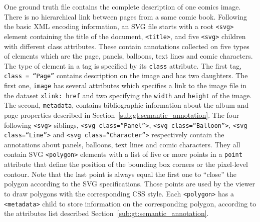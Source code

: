 One ground truth file contains the complete description of one comics image. 
There is no hierarchical link between pages from a same comic book. 
Following the basic XML encoding information, an SVG file starts with a root \texttt{<svg>} element containing the title of the document, \texttt{<title>}, and five \texttt{<svg>} children with different class attributes.
These contain annotations collected on five types of elements which are the page, panels, balloons, text lines and comic characters.
The type of element in a tag is specified by its \texttt{class} attribute.
The first tag, \texttt{class = ``Page''} contains description on the image and has two daughters.
The first one, \texttt{image} has several attributes which specifies a link to the image file in the dataset \texttt{xlink: href} and two specifying the \texttt{width} and \texttt{height} of the image.
The second, \texttt{metadata}, contains bibliographic information about the album and page properties described in Section~\ref{sub:gt:semantic_annotation}.
The four following \texttt{<svg>} siblings, \texttt{<svg class=``Panel''>}, \texttt{<svg class=``Balloon''>}, \texttt{<svg class=``Line''>} and \texttt{<svg class=``Character''>} respectively contain the annotations about panels, balloons, text lines and comic characters. 
They all contain SVG \texttt{<polygon>} elements with a list of five or more points in a \texttt{point} attribute that define the position of the bounding box corners or the pixel-level contour. %
Note that the last point is always equal the first one to ``close'' the polygon according to the SVG specifications. 
Those points are used by the viewer to draw polygons with the corresponding CSS style. 
Each \texttt{<polygon>} has a \texttt{<metadata>} child to store information on the corresponding polygon, according to the attributes list described Section~\ref{sub:gt:semantic_annotation}.


